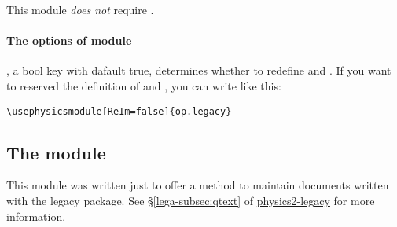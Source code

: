 \documentclass[11pt,letterpaper]{article}
\begin{document}
This module \emph{does not} require .

\paragraph{The options of  module}
, a bool key with dafault true, determines whether to redefine
 and . If you want to reserved the definition of  and
, you can write like this:
\begin{Verbatim}
\usephysicsmodule[ReIm=false]{op.legacy}
\end{Verbatim}

\subsection{The  module}
This module was written just to offer a method to maintain documents written
with the legacy  package. See \S\ref*{lega-subsec:qtext} of
\hyperref{./physics2-legacy.pdf}{}{}{physics2-legacy} for more information.
\end{document}
